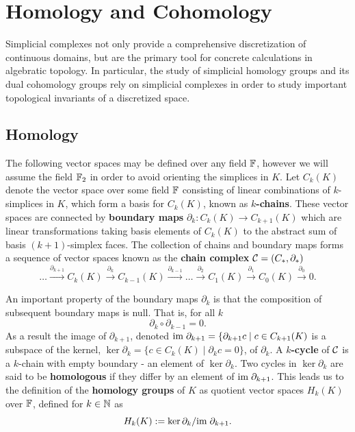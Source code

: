 \section{Homology and Cohomology} %
\label{sec:homology}

Simplicial complexes not only provide a comprehensive discretization of continuous domains, but are the primary tool for concrete calculations in algebratic topology.
In particular, the study of simplicial homology groups and its dual cohomology groups rely on simplicial complexes in order to study important topological invariants of a discretized space.


\subsection{Homology}

The following vector spaces may be defined over any field $\mathbb{F}$, however we will assume the field $\mathbb{F}_2$ in order to avoid orienting the simplices in $K$.
Let $C_k(K)$ denote the vector space over some field $\mathbb{F}$ consisting of linear combinations of $k$-simplices in $K$, which form a basis for $C_k(K)$, known as \textbf{$k$-chains}.
These vector spaces are connected by \textbf{boundary maps} $\partial_k:C_k(K)\to C_{k+1}(K)$ which are linear transformations taking basis elements of $C_k(K)$ to the abstract sum of basis $(k+1)$-simplex faces.
The collection of chains and boundary maps forms a sequence of vector spaces known as the \textbf{chain complex} $\mathcal{C} = (C_*,\partial_*)$
\[
    \ldots\xrightarrow{\partial_{k+1}}
    C_k(K)\xrightarrow{\partial_{k}}
    C_{k-1}(K)\xrightarrow{\partial_{k-1}}
    \ldots\xrightarrow{\partial_2}
    C_1(K)\xrightarrow{\partial_{1}}
    C_0(K)\xrightarrow{\partial_0} 0.
\]

An important property of the boundary maps $\partial_k$ is that the composition of subsequent boundary maps is null.
That is, for all $k$
\[ \partial_k\circ\partial_{k-1} = 0. \]
As a result the image of $\partial_{k+1}$, denoted $\mathrm{im}\;\partial_{k+1} = \{\partial_{k+1}c\mid c\in C_{k+1}(K)$ is a subspace of the kernel, $\ker\partial_k = \{c\in C_k(K)\mid \partial_k c = 0\}$, of $\partial_k$.
A \textbf{$k$-cycle} of $\mathcal{C}$ is a $k$-chain with empty boundary - an element of $\ker\partial_k$.
Two cycles in $\ker\partial_k$ are said to be \textbf{homologous} if they differ by an element of $\mathrm{im}\;\partial_{k+1}$.
This leads us to the definition of the \textbf{homology groups} of $K$ as quotient vector spaces $H_k(K)$ over $\mathbb{F}$, defined for $k\in\mathbb{N}$ as
\[ H_k(K) := \ker\partial_k/\mathrm{im}\;\partial_{k+1}.\]

